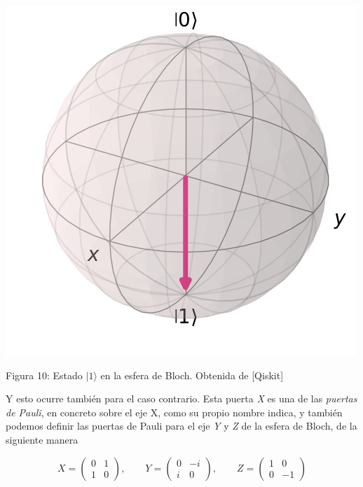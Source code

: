 \documentclass{article}
\numberwithin{equation}{section} %
\begin{document}
    \begin{minipage}{0.3\textwidth}
        \centering
        \includegraphics[width=\textwidth]{img/Bloch/bloch_state_1.png}
        \caption{Figura 10: Estado $|1\rangle$ en la esfera de Bloch. Obtenida de [Qiskit]}
    \end{minipage}
    \begin{minipage}{0.1\textwidth}
        \hfill
    \end{minipage}

    \vspace{5mm}

    Y esto ocurre también para el caso contrario. Esta puerta \textit{X} es una de las \textit{puertas de Pauli}, en concreto sobre el eje X, como su propio nombre indica, y también podemos definir las puertas de Pauli para el eje \textit{Y} y \textit{Z} de la esfera de Bloch, de la siguiente manera

    \begin{equation}
        X = \begin{pmatrix}
            0 & 1 \\
            1 & 0 
        \end{pmatrix}, \qquad Y = \begin{pmatrix}
            0 & -i \\
            i & 0
        \end{pmatrix}, \qquad Z = \begin{pmatrix}
            1 & 0 \\
            0 & -1
        \end{pmatrix}
        \label{eq: puertas_pauli}
    \end{equation}
\end{document}
